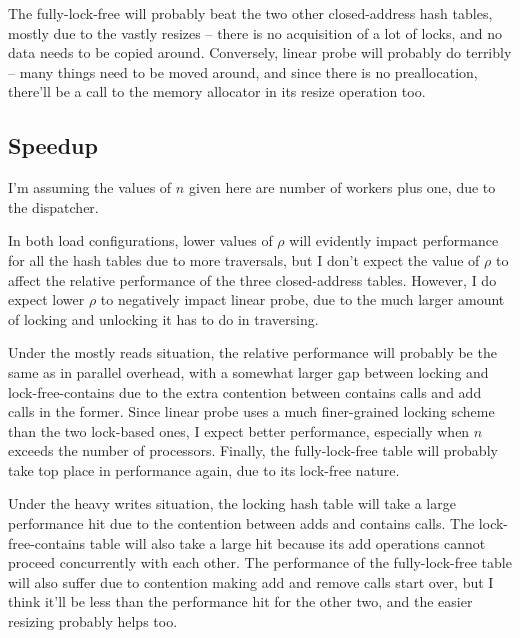 \documentclass{article}
\begin{document}
The fully-lock-free will probably beat the two other closed-address hash tables, mostly due to the vastly resizes -- there is no acquisition of a lot of locks, and no data needs to be copied around. Conversely, linear probe will probably do terribly -- many things need to be moved around, and since there is no preallocation, there'll be a call to the memory allocator in its resize operation too.
\subsection*{Speedup}
I'm assuming the values of $n$ given here are number of workers plus one, due to the dispatcher. 

In both load configurations, lower values of $\rho$ will evidently impact performance for all the hash tables due to more traversals, but I don't expect the value of $\rho$ to affect the relative performance of the three closed-address tables. However, I do expect lower $\rho$ to negatively impact linear probe, due to the much larger amount of locking and unlocking it has to do in traversing.

Under the mostly reads situation, the relative performance will probably be the same as in parallel overhead, with a somewhat larger gap between locking and lock-free-contains due to the extra contention between contains calls and add calls in the former. Since linear probe uses a much finer-grained locking scheme than the two lock-based ones, I expect better performance, especially when $n$ exceeds the number of processors. Finally, the fully-lock-free table will probably take top place in performance again, due to its lock-free nature.

Under the heavy writes situation, the locking hash table will take a large performance hit due to the contention between adds and contains calls. The lock-free-contains table will also take a large hit because its add operations cannot proceed concurrently with each other. The performance of the fully-lock-free table will also suffer due to contention making add and remove calls start over, but I think it'll be less than the performance hit for the other two, and the easier resizing probably helps too.
\end{document}
